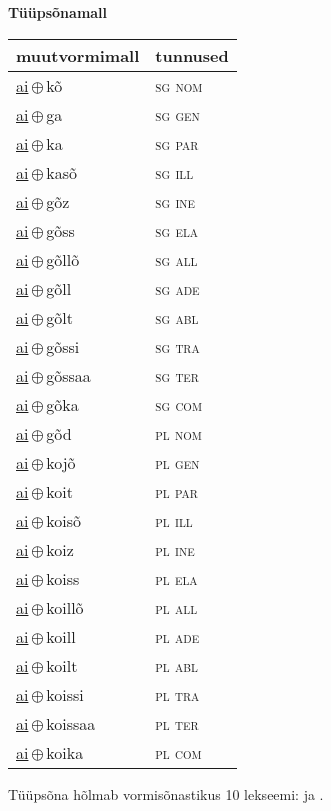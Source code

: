 

\vspace{3.5em}
\noindent \begin{minipage}{\textwidth}
\noindent \textbf{Tüüpsõnamall \,}\\

\begin{sideways}
\begin{tabular}{l l}
muutvormimall & tunnused \\
\hline
\underline{ai}\,$\oplus$\,kõ & \textsc{ sg nom } \\
\underline{ai}\,$\oplus$\,ga & \textsc{ sg gen } \\
\underline{ai}\,$\oplus$\,ka & \textsc{ sg par } \\
\underline{ai}\,$\oplus$\,kasõ & \textsc{ sg ill } \\
\underline{ai}\,$\oplus$\,gõz & \textsc{ sg ine } \\
\underline{ai}\,$\oplus$\,gõss & \textsc{ sg ela } \\
\underline{ai}\,$\oplus$\,gõllõ & \textsc{ sg all } \\
\underline{ai}\,$\oplus$\,gõll & \textsc{ sg ade } \\
\underline{ai}\,$\oplus$\,gõlt & \textsc{ sg abl } \\
\underline{ai}\,$\oplus$\,gõssi & \textsc{ sg tra } \\
\underline{ai}\,$\oplus$\,gõssaa & \textsc{ sg ter } \\
\underline{ai}\,$\oplus$\,gõka & \textsc{ sg com } \\
\underline{ai}\,$\oplus$\,gõd & \textsc{ pl nom } \\
\underline{ai}\,$\oplus$\,kojõ & \textsc{ pl gen } \\
\underline{ai}\,$\oplus$\,koit & \textsc{ pl par } \\
\underline{ai}\,$\oplus$\,koisõ & \textsc{ pl ill } \\
\underline{ai}\,$\oplus$\,koiz & \textsc{ pl ine } \\
\underline{ai}\,$\oplus$\,koiss & \textsc{ pl ela } \\
\underline{ai}\,$\oplus$\,koillõ & \textsc{ pl all } \\
\underline{ai}\,$\oplus$\,koill & \textsc{ pl ade } \\
\underline{ai}\,$\oplus$\,koilt & \textsc{ pl abl } \\
\underline{ai}\,$\oplus$\,koissi & \textsc{ pl tra } \\
\underline{ai}\,$\oplus$\,koissaa & \textsc{ pl ter } \\
\underline{ai}\,$\oplus$\,koika & \textsc{ pl com } \\
\end{tabular}
\end{sideways}
\label{tab:tüüpsõnamall-aikõ}

\end{minipage}

 
\vspace{1em}
\noindent Tüüpsõna hõlmab vormisõnastikus 10 lekseemi:  ja .
